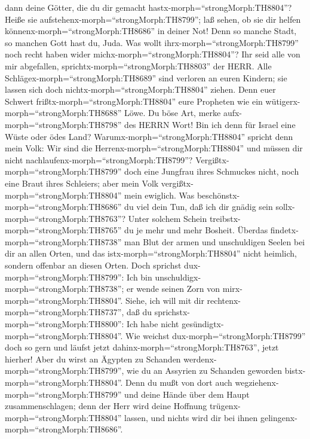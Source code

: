 dann deine Götter, die du dir gemacht
hastx-morph=``strongMorph:TH8804''? Heiße sie
aufstehenx-morph=``strongMorph:TH8799''; laß sehen, ob sie dir helfen
könnenx-morph=``strongMorph:TH8686'' in deiner Not! Denn so manche
Stadt, so manchen Gott hast du, Juda.  Was wollt
ihrx-morph=``strongMorph:TH8799'' noch recht haben wider
michx-morph=``strongMorph:TH8804''? Ihr seid alle von mir abgefallen,
sprichtx-morph=``strongMorph:TH8803'' der HERR.  Alle
Schlägex-morph=``strongMorph:TH8689'' sind verloren an euren Kindern;
sie lassen sich doch nichtx-morph=``strongMorph:TH8804'' ziehen. Denn
euer Schwert frißtx-morph=``strongMorph:TH8804'' eure Propheten wie ein
wütigerx-morph=``strongMorph:TH8688'' Löwe.  Du böse Art,
merke aufx-morph=``strongMorph:TH8798'' des HERRN Wort! Bin ich denn für
Israel eine Wüste oder ödes Land? Warumx-morph=``strongMorph:TH8804''
spricht denn mein Volk: Wir sind die
Herrenx-morph=``strongMorph:TH8804'' und müssen dir nicht
nachlaufenx-morph=``strongMorph:TH8799''? 
Vergißtx-morph=``strongMorph:TH8799'' doch eine Jungfrau ihres Schmuckes
nicht, noch eine Braut ihres Schleiers; aber mein Volk
vergißtx-morph=``strongMorph:TH8804'' mein ewiglich.  Was
beschönstx-morph=``strongMorph:TH8686'' du viel dein Tun, daß ich dir
gnädig sein sollx-morph=``strongMorph:TH8763''? Unter solchem Schein
treibstx-morph=``strongMorph:TH8765'' du je mehr und mehr Bosheit.
 Überdas findetx-morph=``strongMorph:TH8738'' man Blut der
armen und unschuldigen Seelen bei dir an allen Orten, und das
istx-morph=``strongMorph:TH8804'' nicht heimlich, sondern offenbar an
diesen Orten.  Doch sprichst
dux-morph=``strongMorph:TH8799'': Ich bin
unschuldigx-morph=``strongMorph:TH8738''; er wende seinen Zorn von
mirx-morph=``strongMorph:TH8804''. Siehe, ich will mit dir
rechtenx-morph=``strongMorph:TH8737'', daß du
sprichstx-morph=``strongMorph:TH8800'': Ich habe nicht
gesündigtx-morph=``strongMorph:TH8804''.  Wie weichst
dux-morph=``strongMorph:TH8799'' doch so gern und läufst jetzt
dahinx-morph=``strongMorph:TH8763'', jetzt hierher! Aber du wirst an
Ägypten zu Schanden werdenx-morph=``strongMorph:TH8799'', wie du an
Assyrien zu Schanden geworden bistx-morph=``strongMorph:TH8804''.
 Denn du mußt von dort auch
wegziehenx-morph=``strongMorph:TH8799'' und deine Hände über dem Haupt
zusammenschlagen; denn der Herr wird deine Hoffnung
trügenx-morph=``strongMorph:TH8804'' lassen, und nichts wird dir bei
ihnen gelingenx-morph=``strongMorph:TH8686''.

